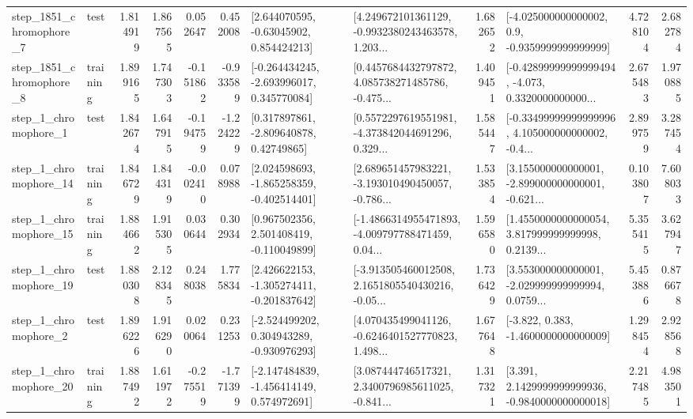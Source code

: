 \begin{tabular}{llrrrrllrlrr}
  step\_1851\_chromophore\_7 &      test &      1.814919 &    1.867565 &      0.052647 &  0.452008 &     [2.644070595, -0.63045902, 0.854424213] &  [4.249672101361129, -0.9932380243463578, 1.203... &       1.682652 &     [-4.025000000000002, 0.9, -0.9359999999999999] &            4.728104 &          2.682784 \\
  step\_1851\_chromophore\_8 &  training &      1.899165 &    1.747303 &     -0.151862 & -0.933589 &   [-0.264434245, -2.693996017, 0.345770084] &  [0.4457684432797872, 4.085738271485786, -0.475... &       1.409451 &  [-0.42899999999999494, -4.073, 0.3320000000000... &            2.675483 &          1.970885 \\
     step\_1\_chromophore\_1 &      test &      1.842674 &    1.647915 &     -0.194759 & -1.224229 &     [0.317897861, -2.809640878, 0.42749865] &  [0.5572297619551981, -4.373842044691296, 0.329... &       1.585447 &  [-0.33499999999999996, 4.105000000000002, -0.4... &            2.899759 &          3.287454 \\
    step\_1\_chromophore\_14 &  training &      1.846729 &    1.844319 &     -0.002410 &  0.078988 &   [2.024598693, -1.865258359, -0.402514401] &  [2.689651457983221, -3.193010490450057, -0.786... &       1.533854 &  [3.155000000000001, -2.899000000000001, -0.621... &            0.103807 &          7.608033 \\
    step\_1\_chromophore\_15 &  training &      1.884662 &    1.915305 &      0.030644 &  0.302934 &    [0.967502356, 2.501408419, -0.110049899] &  [-1.4866314955471893, -4.009797788471459, 0.04... &       1.596580 &  [1.4550000000000054, 3.817999999999998, 0.2139... &            5.355415 &          3.627947 \\
    step\_1\_chromophore\_19 &      test &      1.880308 &    2.128345 &      0.248038 &  1.775834 &   [2.426622153, -1.305274411, -0.201837642] &  [-3.913505460012508, 2.1651805540430216, -0.05... &       1.736429 &  [3.553000000000001, -2.029999999999994, 0.0759... &            5.453886 &          0.876678 \\
     step\_1\_chromophore\_2 &      test &      1.896226 &    1.916290 &      0.020064 &  0.231253 &   [-2.524499202, 0.304943289, -0.930976293] &  [4.070435499041126, -0.6246401527770823, 1.498... &       1.677648 &               [-3.822, 0.383, -1.4600000000000009] &            1.298454 &          2.928568 \\
    step\_1\_chromophore\_20 &  training &      1.887492 &    1.611972 &     -0.275519 & -1.771399 &   [-2.147484839, -1.456414149, 0.574972691] &  [3.087444746517321, 2.3400796985611025, -0.841... &       1.317321 &   [3.391, 2.1429999999999936, -0.9840000000000018] &            2.217485 &          4.983501 \\

\end{tabular}
